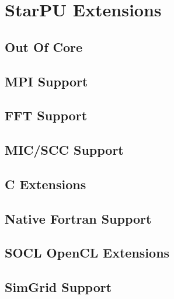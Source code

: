 \part{StarPU Extensions}

\chapter{Out Of Core}
\label{OutOfCore}
\hypertarget{OutOfCore}{}


\chapter{MPI Support}
\label{MPISupport}
\hypertarget{MPISupport}{}


\chapter{FFT Support}
\label{FFTSupport}
\hypertarget{FFTSupport}{}


\chapter{MIC/SCC Support}
\label{MICSCCSupport}
\hypertarget{MICSCCSupport}{}


\chapter{C Extensions}
\label{cExtensions}
\hypertarget{cExtensions}{}


\chapter{Native Fortran Support}
\label{NativeFortranSupport}
\hypertarget{NativeFortranSupport}{}


\chapter{SOCL OpenCL Extensions}
\label{SOCLOpenclExtensions}
\hypertarget{SOCLOpenclExtensions}{}


\chapter{SimGrid Support}
\label{SimGridSupport}
\hypertarget{SimGridSupport}{}


